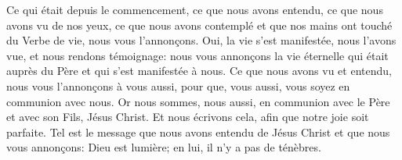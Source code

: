 Ce qui était depuis le commencement,
	ce que nous avons entendu, ce que nous avons vu de nos yeux,
	ce que nous avons contemplé et que nos mains ont touché du Verbe de vie,
	nous vous l’annonçons.
Oui, la vie s’est manifestée,
	nous l’avons vue, et nous rendons témoignage:
	nous vous annonçons la vie éternelle qui était auprès du Père
	et qui s’est manifestée à nous.
Ce que nous avons vu et entendu, nous vous l’annonçons à vous aussi,
	pour que, vous aussi, vous soyez en communion avec nous.
Or nous sommes, nous aussi, en communion avec le Père
	et avec son Fils, Jésus Christ.
Et nous écrivons cela, afin que notre joie soit parfaite.
Tel est le message que nous avons entendu de Jésus Christ
		et que nous vous annonçons:
	Dieu est lumière; en lui, il n’y a pas de ténèbres.
